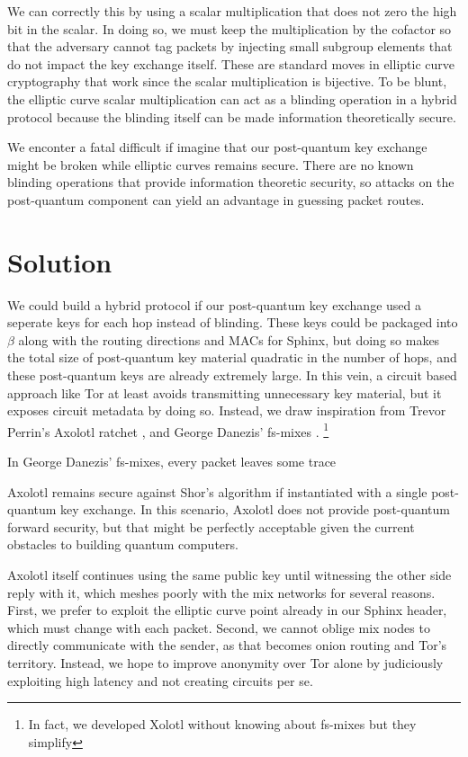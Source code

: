 \documentclass[twoside,letterpaper]{sig-alternate}
\begin{document}
We can correctly this by using a scalar multiplication that does not
zero the high bit in the scalar.  In doing so, we must keep the
multiplication by the cofactor so that the adversary cannot tag
packets by injecting small subgroup elements that do not impact the
key exchange itself.  These are standard moves in elliptic curve 
cryptography that work since the scalar multiplication is bijective.
To be blunt, the elliptic curve scalar multiplication can act as
a blinding operation in a hybrid protocol because the blinding itself
can be made information theoretically secure.

We enconter a fatal difficult if imagine that our post-quantum key 
exchange might be broken while elliptic curves remains secure.  
There are no known blinding operations that provide information
theoretic security, so attacks on the post-quantum component can
yield an advantage in guessing packet routes.


\section{Solution}

We could build a hybrid protocol if our post-quantum key exchange
used a seperate keys for each hop instead of blinding.  These keys
could be packaged into $\beta$ along with the routing directions and
MACs for Sphinx, but doing so makes the total size of post-quantum 
key material quadratic in the number of hops, and these post-quantum
keys are already extremely large.
In this vein, a circuit based approach like Tor at least avoids
transmitting unnecessary key material, but it exposes circuit
metadata by doing so. 
Instead, we draw inspiration from Trevor Perrin's Axolotl ratchet
\cite{Axolotl}, and George Danezis' fs-mixes \cite{fs-mix}.
\footnote{In fact, we developed Xolotl without knowing about fs-mixes
but they simplify }

In George Danezis' fs-mixes, every packet leaves some trace 


Axolotl remains secure against Shor's algorithm if instantiated with
a single post-quantum key exchange.  In this scenario, Axolotl does
not provide post-quantum forward security, but that might be perfectly
acceptable given the current obstacles to building quantum computers.




Axolotl itself continues using the same public key until witnessing
 the other side reply with it, which meshes poorly with the mix networks
for several reasons.
%
First, we prefer to exploit the elliptic curve point
 already in our Sphinx header, which must change with each packet.
%
Second, we cannot oblige mix nodes to directly communicate with
 the sender, as that becomes onion routing and Tor's territory.
%
Instead, we hope to improve anonymity over Tor alone by
 judiciously exploiting high latency and not creating circuits per se.
\end{document}
